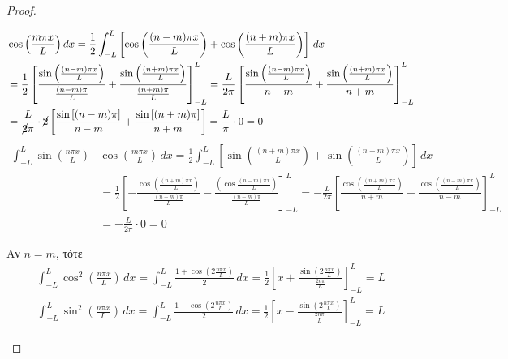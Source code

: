 \begin{proof}
\begin{myitemize}
\begin{align*}
        &\cos{\left(\frac{m \pi x}{L}\right)} \,{dx} 
        = \frac{1}{2} \int _{-L}^{L} \left[\cos{\left(\frac{(n-m) \pi x}{L}\right)} 
        + \cos{\left(\frac{(n+m) \pi x}{L}\right)} \right] \,{dx} \\
        &= \frac{1}{2} \left[\frac{\sin{\left(\frac{(n-m) \pi x}{L}\right)}}
          {\frac{(n-m) \pi}{L}} + \frac{\sin{\left(\frac{(n+m) \pi x}{L}\right)}}
        {\frac{(n+m) \pi }{L}}\right]_{-L}^{L} 
        = \frac{L}{2 \pi} \left[\frac{\sin{\left(\frac{(n-m) \pi
          x}{L}\right)}}{n-m} + 
        \frac{\sin{\left(\frac{(n+m) \pi x}{L}\right)}}{n+m}\right]_{-L}^{L} \\ 
        &= \frac{L}{\cancel{2}\pi} \cdot \cancel{2}
        \left[ \frac{\sin{[(n-m) \pi]}}{n-m} + \frac{\sin{[(n+m)
        \pi]}}{n+m}\right] = \frac{L}{\pi} \cdot 0 = 0
      \end{align*}
      \begin{align*}
        \int _{-L}^{L} \sin{\left(\frac{n \pi x }{L}\right)} 
        &\cos{\left(\frac{m \pi x}{L}\right)} \,{dx} 
        = \frac{1}{2} \int _{-L}^{L} \left[\sin{\left(\frac{(n+m) \pi x}{L}\right)} 
        + \sin{\left(\frac{(n-m) \pi x}{L}\right)} \right] \,{dx} \\
        &= \frac{1}{2} \left[-\frac{\cos{\left(\frac{(n+m) \pi x}{L}\right)}}
          {\frac{(n+m) \pi}{L}} - \frac{\left(\cos{\frac{(n-m) \pi x}{L}}\right)}
        {\frac{(n-m) \pi }{L}}\right]_{-L}^{L}
        =-\frac{L}{2 \pi} \left[\frac{\cos{\left(\frac{(n+m) \pi x}{L}\right)}}{n+m} + 
        \frac{\cos{\left(\frac{(n-m) \pi x}{L}\right)}}{n-m}\right]_{-L}^{L} \\
        &= -\frac{L}{2\pi}\cdot 0 = 0
      \end{align*}
    \item Αν $ n = m $, τότε
      \begin{align*}
        \int _{-L}^{L} \cos^{2}\left(\frac{n \pi x}{L}\right) \,{dx} = 
        \int _{-L}^{L} \frac{1+ \cos{\left( 2 \frac{n \pi x}{L} \right)}}{2}
        \,{dx} = 
        \frac{1}{2} \left[x + \frac{\sin{\left(2 \frac{n \pi x}{L}\right)}}
        {\frac{2 n \pi}{L}} \right]_{-L}^{L} = L
      \end{align*}
      \begin{align*}
        \int _{-L}^{L} \sin^{2}\left(\frac{n \pi x}{L}\right) \,{dx} = 
        \int _{-L}^{L} \frac{1- \cos{\left( 2 \frac{n \pi x}{L} \right)}}{2}
        \,{dx} = 
        \frac{1}{2} \left[x - \frac{\sin{\left(2 \frac{n \pi x}{L}\right)}}
        {\frac{2 n \pi}{L}} \right]_{-L}^{L} = L

\end{align*}
\end{myitemize}
\end{proof}
